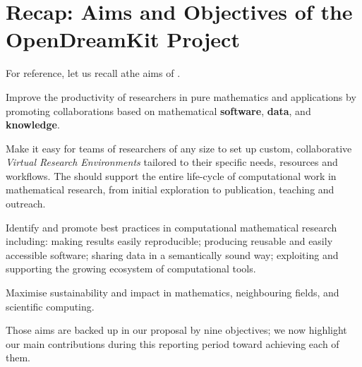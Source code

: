 \section{Recap: Aims and Objectives of the OpenDreamKit Project}
For reference, let us recall athe aims of \ODK.
\begin{compactenum}[\bf {A}1\rm:]
\item \label{aim:collaboration} Improve the productivity of
  researchers in pure mathematics and applications by promoting
  collaborations based on mathematical \textbf{software},
  \textbf{data}, and \textbf{knowledge}.
\item \label{aim:vre} Make it easy for teams of researchers of any
  size to set up custom, collaborative \emph{Virtual Research
    Environments} tailored to their specific needs, resources and
  workflows. The \VREs should support the entire life-cycle of
  computational work in mathematical research, from initial
  exploration to publication, teaching and outreach.
\item \label{aim:sharing} Identify and promote best practices in
  computational mathematical research including: making results easily
  reproducible; producing reusable and easily accessible
  software; sharing data in a semantically sound way; exploiting and
  supporting the growing ecosystem of computational tools.
\item \label{aim:impact} Maximise sustainability and impact in
  mathematics, neighbouring fields, and scientific computing.
\end{compactenum}

Those aims are backed up in our proposal by nine objectives; we now
highlight our main contributions during this reporting period toward
achieving each of them.

